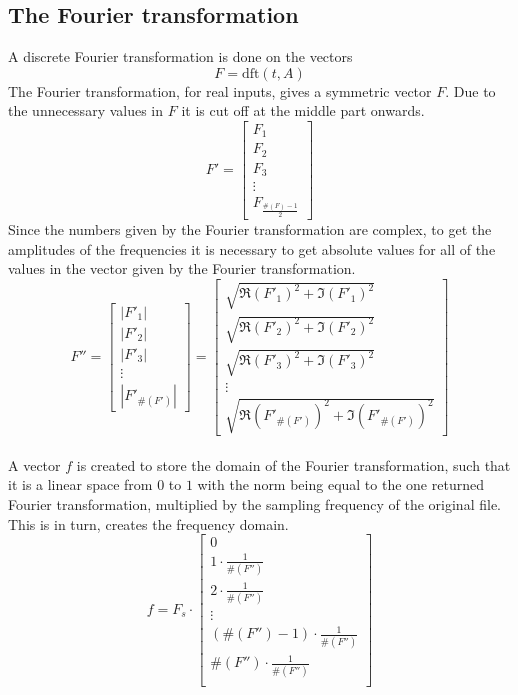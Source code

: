\documentclass{article}
\begin{document}
\subsection{The Fourier transformation}
A discrete Fourier transformation is done on the vectors
$$F = \text{dft}(t, A)$$
The Fourier transformation, for real inputs, gives a symmetric vector $F$. Due
to the unnecessary values in $F$ it is cut off at the middle part onwards.
$$F' =
\begin{bmatrix}
	F_1 \\
	F_2 \\
	F_3 \\
	\vdots \\
	F_{\frac{\#(F) - 1}{2}}
\end{bmatrix}
$$
Since the numbers given by the Fourier transformation are complex, to get the 
amplitudes of the frequencies it is necessary to get absolute values for all 
of the values in the vector given by the Fourier transformation.
$$F'' = 
\begin{bmatrix}
	|F'_1| \\
	|F'_2| \\
	|F'_3| \\
	\vdots \\
	\left| F'_{\#(F')} \right|
\end{bmatrix} =
\begin{bmatrix}
	\sqrt{\Re(F'_1)^2 + \Im(F'_1)^2} \\
	\sqrt{\Re(F'_2)^2 + \Im(F'_2)^2} \\
	\sqrt{\Re(F'_3)^2 + \Im(F'_3)^2} \\
	\vdots \\
	\sqrt{\Re \left( F'_{\#(F')} \right) ^2 + \Im \left( F'_{\#(F')} \right)^2}
\end{bmatrix}
$$

\paragraph*{}
A vector $f$ is created to store the domain of the Fourier transformation, 
such that it is a linear space from $0$ to $1$ with the norm being equal to 
the one returned Fourier transformation, multiplied by the sampling frequency 
of the original file. This is in turn, creates the frequency domain.
$$f = F_s \cdot
\begin{bmatrix}
	0 \\
	1 \cdot \frac{1}{\#(F'')} \\
	2 \cdot \frac{1}{\#(F'')} \\
	\vdots \\
	\left( \#(F'') - 1 \right) \cdot \frac{1}{\#(F'')} \\
	\#(F'') \cdot \frac{1}{\#(F'')} \\
\end{bmatrix}
$$
\end{document}
